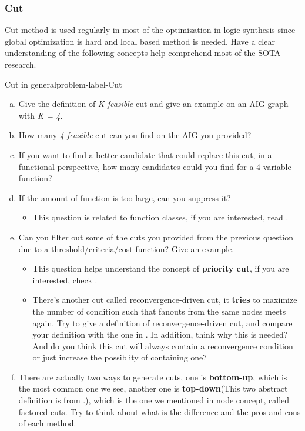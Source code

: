 \documentclass[main.tex]{subfiles}
\begin{document}
\subsubsection{Cut}
Cut method is used regularly in most of the optimization in logic synthesis since global optimization is hard and local based method is needed. Have a clear understanding of the following concepts help comprehend most of the SOTA research.
\begin{problem}{Cut in general}{problem-label-Cut}
\begin{enumerate}[(a)]
   \item Give the definition of \textit{K-feasible} cut and give an example on an AIG graph with \textit{K = 4}.
   \item How many \textit{4-feasible} cut can you find on the AIG you provided? 
   \item If you want to find a better candidate that could replace this cut, in a functional perspective, how many candidates could you find for a 4 variable function?
   \item If the amount of function is too large, can you suppress it?
   \begin{itemize}
       \item This question is related to function classes, if you are interested, read \cite{HuangNPN}.
   \end{itemize}

   \item Can you filter out some of the cuts you provided from the previous question due to a threshold/criteria/cost function? Give an example.
   \begin{itemize}
       \item This question helps understand the concept of \textbf{priority cut}, if you are interested, check \cite{PriorityCuts}.
       \item There's another cut called reconvergence-driven cut, it \textbf{tries} to maximize the number of condition such that fanouts from the same nodes meets again. Try to give a definition of reconvergence-driven cut, and compare your definition with the one in \cite{Mishchenko2006ScalableLS}. In addition, think why this is needed? And do you think this cut will always contain a reconvergence condition or just increase the possiblity of containing one?
   \end{itemize}
   \item There are actually two ways to generate cuts, one is \textbf{bottom-up}, which is the most common one we see, another one is \textbf{top-down}(This two abstract definition is from \cite{TestaLS}.), which is the one we mentioned in node concept, called factored cuts. Try to think about what is the difference and the pros and cons of each method.
\end{enumerate}
\end{problem}
\vspace*{4\baselineskip}
\end{document}
